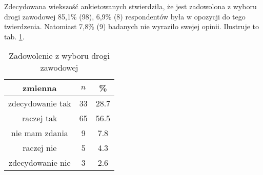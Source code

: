 
Zdecydowana wiekszość ankietowanych stwierdziła, że jest zadowolona z wyboru drogi zawodowej 85,1\% (98), 6,9\% (8) respondentów była w opozycji do tego twierdzenia. Natomiast 7,8\% (9) badanych nie wyraziło swejej opinii. Ilustruje to tab. \ref{tab:Q5}.

\begin{table}[H]
\caption{Zadowolenie z wyboru drogi zawodowej}
\centering
\begin{tabular}{ | c | c | c |}
\hline
zmienna & $n$ & \% \\
\hline
zdecydowanie tak  &  33  & 28.7 \\
\hline
raczej tak  &  65  & 56.5\\
\hline
nie mam zdania  &  9  & 7.8 \\
\hline
raczej nie  &  5  & 4.3 \\
\hline
zdecydowanie nie  &  3  & 2.6 \\
\hline
\end{tabular}
\label{tab:Q5}
\end{table}

